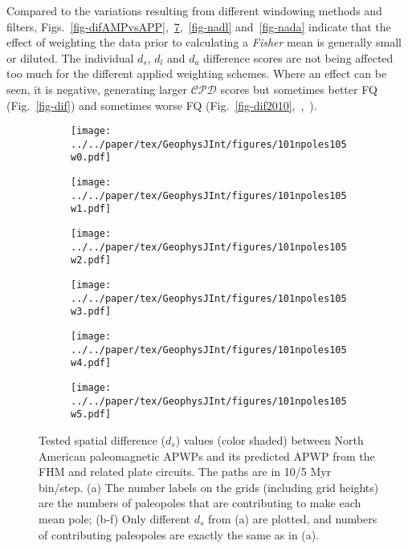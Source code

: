 Compared to the variations resulting from different windowing methods and
filters, Figs.~\ref{fig-difAMPvsAPP},~\ref{fig-nads},~\ref{fig-nadl}
and~\ref{fig-nada} indicate that the effect of weighting the data prior to
calculating a \emph{Fisher} mean is generally small or diluted. The individual
$d_s$, $d_l$ and $d_a$ difference scores are not being affected too much for the
different applied weighting schemes. Where an effect can be seen, it is
negative, generating larger $\mathcal{CPD}$ scores but sometimes better FQ
(Fig.~\ref{fig-dif}) and sometimes worse FQ
(Fig.~\ref{fig-dif2010},~,~).

\begin{figure}[!ht]
  \captionsetup[subfigure]{singlelinecheck=off,justification=raggedright,aboveskip=-6pt,belowskip=-6pt}
  \centering
  \begin{subfigure}{.495\textwidth}
    \texttt{[image: ../../paper/tex/GeophysJInt/figures/101npoles105w0.pdf]}
    \caption{}\label{fig-na-dsw0}
  \end{subfigure}
  \vspace{.1em}
  \begin{subfigure}{.495\textwidth}
    \texttt{[image: ../../paper/tex/GeophysJInt/figures/101npoles105w1.pdf]}
    \caption{}\label{fig-na-dsw1}
  \end{subfigure}
  \vspace{.1em}
  \begin{subfigure}{.495\textwidth}
    \texttt{[image: ../../paper/tex/GeophysJInt/figures/101npoles105w2.pdf]}
    \caption{}\label{fig-na-dsw2}
  \end{subfigure}
  \vspace{.1em}
  \begin{subfigure}{.495\textwidth}
    \texttt{[image: ../../paper/tex/GeophysJInt/figures/101npoles105w3.pdf]}
    \caption{}\label{fig-na-dsw3}
  \end{subfigure}
  \vspace{.1em}
  \begin{subfigure}{.495\textwidth}
    \texttt{[image: ../../paper/tex/GeophysJInt/figures/101npoles105w4.pdf]}
    \caption{}\label{fig-na-dsw4}
  \end{subfigure}
  \vspace{.1em}
  \begin{subfigure}{.495\textwidth}
    \texttt{[image: ../../paper/tex/GeophysJInt/figures/101npoles105w5.pdf]}
    \caption{}\label{fig-na-dsw5}
  \end{subfigure}
  \caption[$d_s$ of each pair of poles for North American 10/5 Myr APWPs]{Tested
    spatial difference ($d_s$) values (color shaded) between North American
    paleomagnetic APWPs and its predicted APWP from the FHM and related plate
    circuits. The paths are in 10/5 Myr bin/step. (a) The number labels on the
    grids (including grid heights) are the numbers of paleopoles that are
    contributing to make each mean pole; (b-f) Only different $d_s$ from (a) are
    plotted, and numbers of contributing paleopoles are exactly the same as in
    (a).}\label{fig-nads}
\end{figure}

